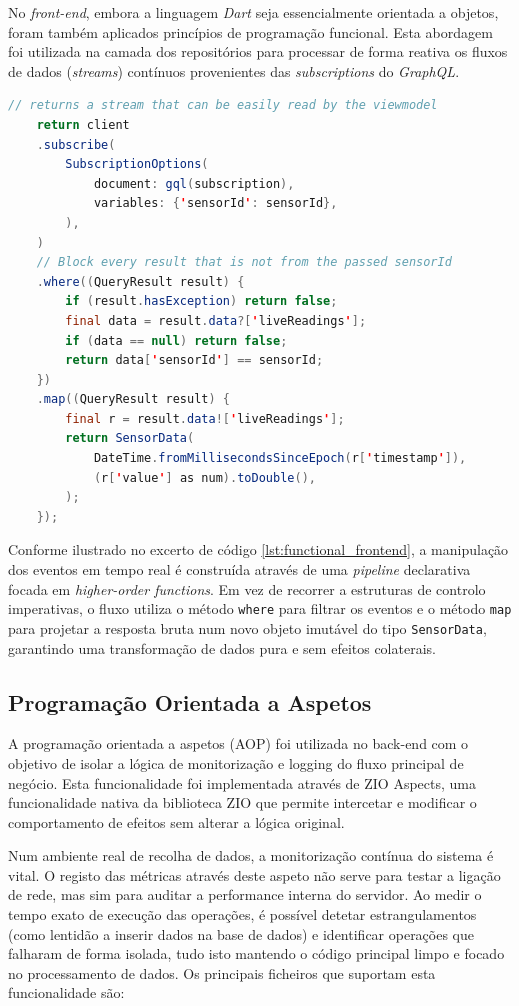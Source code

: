 No \textit{front-end}, embora a linguagem \textit{Dart} seja essencialmente orientada a objetos, foram também aplicados princípios de programação funcional. Esta abordagem foi utilizada na camada dos repositórios para processar de forma reativa os fluxos de dados (\textit{streams}) contínuos provenientes das \textit{subscriptions} do \textit{GraphQL}.

\begin{lstlisting}[language=Java, caption={Processamento funcional de uma \textit{Stream} de dados no \textit{front-end}}, label={lst:functional_frontend}]
	// returns a stream that can be easily read by the viewmodel
	return client
	.subscribe(
		SubscriptionOptions(
			document: gql(subscription),
			variables: {'sensorId': sensorId},
		),
	)
	// Block every result that is not from the passed sensorId
	.where((QueryResult result) {
		if (result.hasException) return false;
		final data = result.data?['liveReadings'];
		if (data == null) return false;
		return data['sensorId'] == sensorId;
	})
	.map((QueryResult result) {
		final r = result.data!['liveReadings'];
		return SensorData(
			DateTime.fromMillisecondsSinceEpoch(r['timestamp']),
			(r['value'] as num).toDouble(),
		);
	});
\end{lstlisting}

Conforme ilustrado no excerto de código \ref{lst:functional_frontend}, a manipulação dos eventos em tempo real é construída através de uma \textit{pipeline} declarativa focada em \textit{higher-order functions}. Em vez de recorrer a estruturas de controlo imperativas, o fluxo utiliza o método \texttt{where} para filtrar os eventos e o método \texttt{map} para projetar a resposta bruta num novo objeto imutável do tipo \texttt{SensorData}, garantindo uma transformação de dados pura e sem efeitos colaterais.


\subsection{Programação Orientada a Aspetos}
A programação orientada a aspetos (AOP) foi utilizada no back-end com o objetivo de isolar a lógica de monitorização e logging do fluxo principal de negócio. Esta funcionalidade foi implementada através de ZIO Aspects, uma funcionalidade nativa da biblioteca ZIO que permite intercetar e modificar o comportamento de efeitos sem alterar a lógica original.

Num ambiente real de recolha de dados, a monitorização contínua do sistema é vital. O registo das métricas através deste aspeto não serve para testar a ligação de rede, mas sim para auditar a performance interna do servidor. Ao medir o tempo exato de execução das operações, é possível detetar estrangulamentos (como lentidão a inserir dados na base de dados) e identificar operações que falharam de forma isolada, tudo isto mantendo o código principal limpo e focado no processamento de dados.
Os principais ficheiros que suportam esta funcionalidade são:

